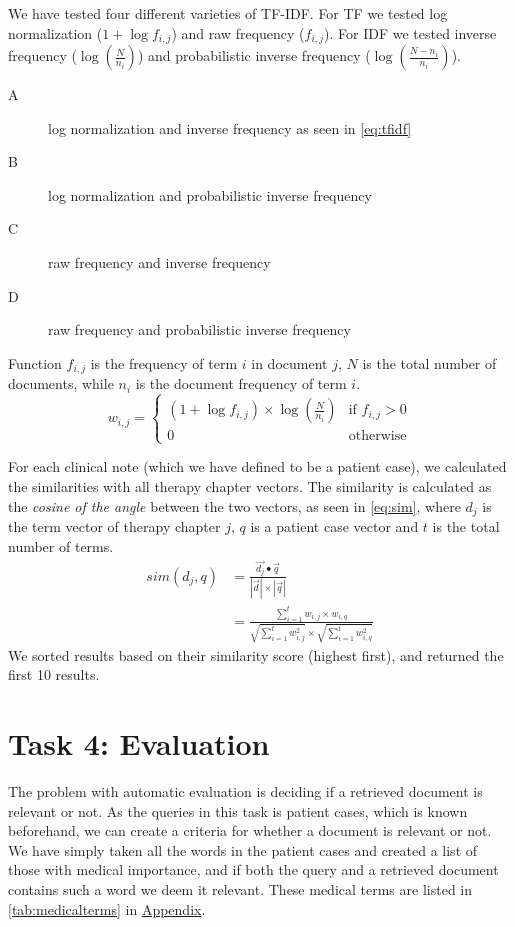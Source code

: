 We have tested four different varieties of TF-IDF. For TF we tested log
normalization (\( 1 + \log f_{i,j} \)) and raw frequency (\( f_{i,j} \)).
For IDF we tested inverse frequency (\( \log(\frac{N}{n_{i}}) \)) and
probabilistic inverse frequency (\( \log(\frac{N - n_{i}}{n_{i}}) \)).
\begin{description}
	\item[A] log normalization and inverse frequency as seen in \autoref{eq:tfidf}
	\item[B] log normalization and probabilistic inverse frequency
	\item[C] raw frequency and inverse frequency 
	\item[D] raw frequency and probabilistic inverse frequency
\end{description}
Function \( f_{i,j} \) is the frequency of term \( i \) in document
\( j \), \( N \) is the total number of documents, while \( n_{i} \) is the
document frequency of term \( i \).
\begin{equation} \label{eq:tfidf}
	w_{i,j} =
	\begin{cases}
		(1 + \log f_{i,j}) \times \log(\frac{N}{n_{i}}) & \text{if } f_{i,j} > 0 \\
		0												& \text{otherwise}
	\end{cases}
\end{equation}

For each clinical note (which we have defined to be a patient case), we
calculated the similarities with all therapy chapter vectors. The similarity is
calculated as the \emph{cosine of the angle} between the two vectors, as seen
in \autoref{eq:sim}, where \( d_{j} \) is the term vector of therapy chapter \( j \),
\( q \) is a patient case vector and \( t \) is the total number of terms.
\begin{align} \label{eq:sim}
	sim(d_{j}, q) &= \frac{\vec{d_{j}} \bullet \vec{q}}{|\vec{d}| \times |\vec{q}|} \nonumber \\
				  &= \frac{\sum_{i=1}^{t} w_{i,j} \times w_{i,q}}{\sqrt{\sum_{i=1}^{t} w_{i,j}^2} \times \sqrt{\sum_{i=1}^{t} w_{i,q}^2}}
\end{align}
We sorted results based on their similarity score (highest first), and
returned the first 10 results.


\section{Task 4: Evaluation}
The problem with automatic evaluation is deciding if a retrieved document
is relevant or not. As the queries in this task is patient cases, which is
known beforehand, we can create a criteria for whether a document is relevant
or not. We have simply taken all the words in the patient cases and created a
list of those with medical importance, and if both the query and a retrieved
document contains such a word we deem it relevant. These medical terms are
listed in \autoref{tab:medicalterms} in \hyperref[appendix]{Appendix}.

